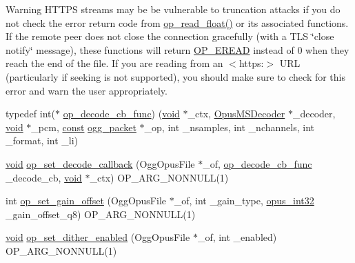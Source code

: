 \begin{DoxyWarning}{Warning}
H\+T\+T\+PS streams may be be vulnerable to truncation attacks if you do not check the error return code from \hyperlink{group__stream__decoding_ga73493002d84a234f5e19b70f1dddbe2a}{op\+\_\+read\+\_\+float()} or its associated functions. If the remote peer does not close the connection gracefully (with a T\+LS \char`\"{}close notify\char`\"{} message), these functions will return \hyperlink{group__error__codes_ga3ad48a4f99b1bed72acec552296dfc08}{O\+P\+\_\+\+E\+R\+E\+AD} instead of 0 when they reach the end of the file. If you are reading from an $<$https\+:$>$ U\+RL (particularly if seeking is not supported), you should make sure to check for this error and warn the user appropriately. 
\end{DoxyWarning}
\begin{DoxyCompactItemize}
\item 
typedef int($\ast$ \hyperlink{group__stream__decoding_ga81a50874a82484034c22dfeddce177e1}{op\+\_\+decode\+\_\+cb\+\_\+func}) (\hyperlink{png_8h_ac9c84fa68bbad002983e35ce3663c686}{void} $\ast$\+\_\+ctx, \hyperlink{group__opus__multistream_gad3497495deb9a8ace82e76cd4f93e0e4}{Opus\+M\+S\+Decoder} $\ast$\+\_\+decoder, \hyperlink{png_8h_ac9c84fa68bbad002983e35ce3663c686}{void} $\ast$\+\_\+pcm, \hyperlink{zconf_8h_a2c212835823e3c54a8ab6d95c652660e}{const} \hyperlink{structogg__packet}{ogg\+\_\+packet} $\ast$\+\_\+op, int \+\_\+nsamples, int \+\_\+nchannels, int \+\_\+format, int \+\_\+li)
\item 
\hyperlink{png_8h_ac9c84fa68bbad002983e35ce3663c686}{void} \hyperlink{group__stream__decoding_gae0d5b986dff23a82b6002915268ee3d1}{op\+\_\+set\+\_\+decode\+\_\+callback} (Ogg\+Opus\+File $\ast$\+\_\+of, \hyperlink{group__stream__decoding_ga81a50874a82484034c22dfeddce177e1}{op\+\_\+decode\+\_\+cb\+\_\+func} \+\_\+decode\+\_\+cb, \hyperlink{png_8h_ac9c84fa68bbad002983e35ce3663c686}{void} $\ast$\+\_\+ctx) O\+P\+\_\+\+A\+R\+G\+\_\+\+N\+O\+N\+N\+U\+LL(1)
\item 
int \hyperlink{group__stream__decoding_ga7df927613ccf57996319678e08513289}{op\+\_\+set\+\_\+gain\+\_\+offset} (Ogg\+Opus\+File $\ast$\+\_\+of, int \+\_\+gain\+\_\+type, \hyperlink{opus__types_8h_aa4d309d6f80b99dbabebc8f98879ab9a}{opus\+\_\+int32} \+\_\+gain\+\_\+offset\+\_\+q8) O\+P\+\_\+\+A\+R\+G\+\_\+\+N\+O\+N\+N\+U\+LL(1)
\item 
\hyperlink{png_8h_ac9c84fa68bbad002983e35ce3663c686}{void} \hyperlink{group__stream__decoding_gac1de9480ad0fa65de778d9c88f62f6f3}{op\+\_\+set\+\_\+dither\+\_\+enabled} (Ogg\+Opus\+File $\ast$\+\_\+of, int \+\_\+enabled) O\+P\+\_\+\+A\+R\+G\+\_\+\+N\+O\+N\+N\+U\+LL(1)

\end{DoxyCompactItemize}
